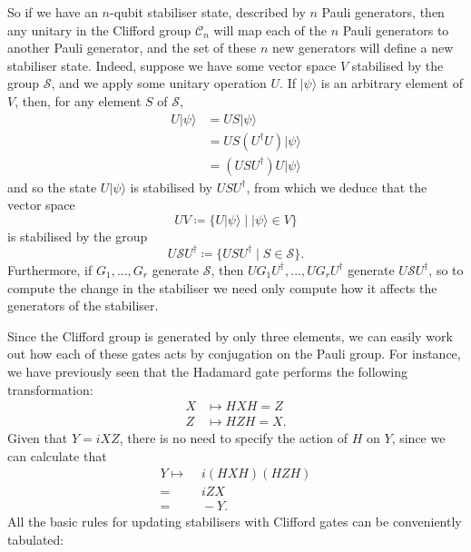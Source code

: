 \documentclass[fleqn,a4paper]{article}
\theoremstyle{definition}
\theoremstyle{definition}
\theoremstyle{definition}
\theoremstyle{definition}
\theoremstyle{remark}
\begin{document}
So if we have an \(n\)-qubit stabiliser state, described by \(n\) Pauli generators, then any unitary in the Clifford group \(\mathcal{C}_n\) will map each of the \(n\) Pauli generators to another Pauli generator, and the set of these \(n\) new generators will define a new stabiliser state.
Indeed, suppose we have some vector space \(V\) stabilised by the group \(\mathcal{S}\), and we apply some unitary operation \(U\).
If \(|\psi\rangle\) is an arbitrary element of \(V\), then, for any element \(S\) of \(\mathcal{S}\),
\[
  \begin{aligned}
    U|\psi\rangle
    &= US|\psi\rangle
    \\&= US(U^\dagger U)|\psi\rangle
    \\&= (USU^\dagger)U|\psi\rangle
  \end{aligned}
\]
and so the state \(U|\psi\rangle\) is stabilised by \(USU^\dagger\), from which we deduce that the vector space
\[
  UV \coloneqq \{U|\psi\rangle \mid |\psi\rangle\in V\}
\]
is stabilised by the group
\[
  U\mathcal{S}U^\dagger \coloneqq \{USU^\dagger \mid S\in\mathcal{S}\}.
\]
Furthermore, if \(G_1,\ldots,G_r\) generate \(\mathcal{S}\), then \(UG_1U^\dagger,\ldots,UG_rU^\dagger\) generate \(U\mathcal{S}U^\dagger\), so to compute the change in the stabiliser we need only compute how it affects the generators of the stabiliser.

Since the Clifford group is generated by only three elements, we can easily work out how each of these gates acts by conjugation on the Pauli group.
For instance, we have previously seen that the Hadamard gate performs the following transformation:
\[
  \begin{aligned}
    X
    &\longmapsto HXH = Z
  \\Z
    &\longmapsto HZH = X.
  \end{aligned}
\]
Given that \(Y=iXZ\), there is no need to specify the action of \(H\) on \(Y\), since we can calculate that
\[
  \begin{aligned}
    Y\longmapsto
    &\,\,i(HXH)(HZH)
  \\=&\,\,iZX
  \\=&\,\,-Y.
  \end{aligned}
\]
All the basic rules for updating stabilisers with Clifford gates can be conveniently tabulated:

\[
\]
\end{document}
